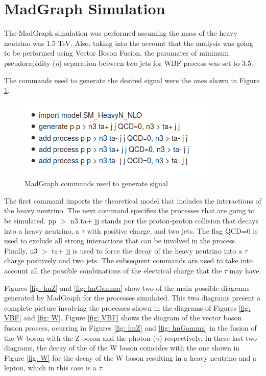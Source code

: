 \section{MadGraph Simulation} \label{sec: mgsim}

The MadGraph simulation was performed assuming the mass of the heavy neutrino was 1.5 TeV. Also, taking into the account that the analysis was going to be performed using Vector Boson Fusion, the paramater of minimum pseudorapidity ($\eta$) separation between two jets for WBF process was set to 3.5.

The commands used to generate the desired signal were the ones shown in Figure \ref{fig: mgCommands}.

\begin{figure}[H]
\centering
\includegraphics[scale = 1]{Figures/mg_commands}
\caption{MadGraph commands used to generate signal}
\label{fig: mgCommands}
\end{figure}

The first command imports the theoretical model that includes the interactions of the heavy neutrino. The next command specifies the processes that are going to be simulated. pp $>$ n3 ta+ jj stands por the proton-proton collision that decays into a heavy neutrino, a $\tau$ with positive charge, and two jets. The flag QCD=0 is used to exclude all strong interactions that can be involved in the process. Finally, n3 $>$ ta+ jj is used to force the decay of the heavy neutrino into a $\tau$ charge positively and two jets. The subsequent commands are used to take into account all the possible combinations of the electrical charge that the $\tau$ may have.

Figures \ref{fig: hnZ} and \ref{fig: hnGamma} show two of the main possible diagrams generated by MadGraph for the processes simulated. This two diagrams present a complete picture involving the processes shown in the diagrams of Figures \ref{fig: VBF} and \ref{fig: W}. Figure \ref{fig: VBF} shows the diagram of the vector boson fusion process, ocurring in Figures \ref{fig: hnZ} and \ref{fig: hnGamma} in the fusion of the W boson with the Z boson and the photon ($\gamma$) respectively. In these last two diagrams, the decay of the of the W boson coincides with the one shown in Figure \ref{fig: W} for the decay of the W boson resulting in a heavy neutrino and a lepton, which in this case is a $\tau$.

